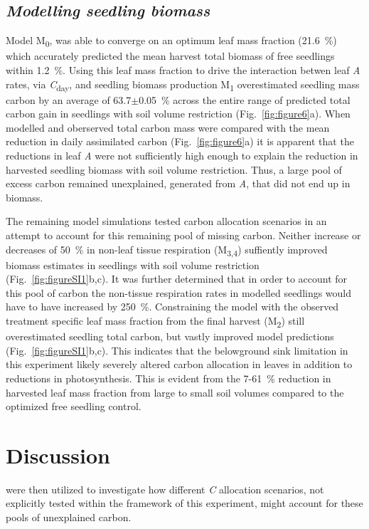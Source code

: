 \documentclass[a4paper]{article}\usepackage[]{graphicx}\usepackage[]{color}
\begin{document}
\subsection*{\textit{Modelling seedling biomass}}
Model M\textsubscript{0}, was able to converge on an optimum leaf mass fraction (21.6~\%) which accurately predicted the mean harvest total biomass of free seedlings within 1.2~\%. Using this leaf mass fraction to drive the interaction betwen leaf \textit{A} rates, via \textit{C}\textsubscript{day}, and seedling biomass production M\textsubscript{1} overestimated seedling mass carbon by an average of 63.7$\pm$0.05~\% across the entire range of predicted total carbon gain in seedlings with soil volume restriction (Fig.~\ref{fig:figure6}a). When modelled and oberserved total carbon mass were compared with the mean reduction in daily assimilated carbon (Fig.~\ref{fig:figure6}a) it is apparent that the reductions in leaf \textit{A} were not sufficiently high enough to explain the reduction in harvested seedling biomass with soil volume restriction.  Thus, a large pool of excess carbon remained unexplained, generated from \textit{A}, that did not end up in biomass.  

The remaining model simulations tested carbon allocation scenarios in an attempt to account for this remaining pool of missing carbon. Neither increase or decreases of 50~\% in non-leaf tissue respiration (M\textsubscript{3,4}) suffiently improved biomass estimates in seedlings with soil volume restriction (Fig.~\ref{fig:figureSI1}b,c). It was further determined that in order to account for this pool of carbon the non-tissue respiration rates in modelled seedlings would have to have increased by 250~\%. Constraining the model with the observed treatment specific leaf mass fraction from the final harvest (M\textsubscript{2}) still overestimated seedling total carbon, but vastly improved model predictions (Fig.~\ref{fig:figureSI1}b,c). This indicates that the belowground sink limitation in this experiment likely severely altered carbon allocation in leaves in addition to reductions in photosynthesis. This is evident from the 7-61~\% reduction in harvested leaf mass fraction from large to small soil volumes compared to the optimized free seedling control.

\section*{Discussion}

were then utilized to investigate how different \textit{C} allocation scenarios, not explicitly tested within the framework of this experiment, might account for these pools of unexplained carbon.
\end{document}
